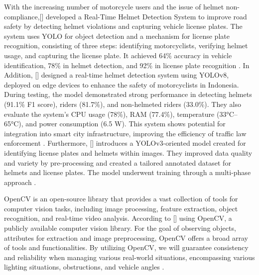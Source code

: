 \begin{refsection}
{    With the increasing number of motorcycle users and the issue of helmet non-compliance,\citeauthor{kumar2024realtime}[\citeyear{kumar2024realtime}] developed a Real-Time Helmet Detection System to improve road safety by detecting helmet violations and capturing vehicle license plates. The system uses YOLO for object detection and a mechanism for license plate recognition, consisting of three steps: identifying motorcyclists, verifying helmet usage, and capturing the license plate. It achieved 64\% accuracy in vehicle identification, 78\% in helmet detection, and 92\% in license plate recognition \cite{kumar2024realtime}. In Addition, \citeauthor{muhammad2024helmet} [\citeyear{muhammad2024helmet}] designed a real-time helmet detection system using YOLOv8, deployed on edge devices to enhance the safety of motorcyclists in Indonesia. During testing, the model demonstrated strong performance in detecting helmets (91.1\% F1 score), riders (81.7\%), and non-helmeted riders (33.0\%). They also evaluate the system’s CPU usage (78\%), RAM (77.4\%), temperature (33°C–65°C), and power consumption (6.5 W). This system shows potential for integration into smart city infrastructure, improving the efficiency of traffic law enforcement \cite {muhammad2024helmet}. Furthermore,\citeauthor{choubey2025helmet} [\citeyear{choubey2025helmet}] introduces a YOLOv3-oriented model created for identifying license plates and helmets within images. They improved data quality and variety by pre-processing and created a tailored annotated dataset for helmets and license plates. The model underwent training through a multi-phase approach \cite{choubey2025helmet}.

    OpenCV is an open-source library that provides a vast collection of tools for computer vision tasks, including image processing, feature extraction, object recognition, and real-time video analysis. According to \citeauthor{satheesh2024automated} [\citeyear{satheesh2024automated}] using OpenCV, a publicly available computer vision library. For the goal of observing objects, attributes for extraction and image preprocessing, OpenCV offers a broad array of tools and functionalities. By utilizing OpenCV, we will guarantee consistency and reliability when managing various real-world situations, encompassing various lighting situations, obstructions, and vehicle angles \cite{satheesh2024automated}.

}
\end{refsection}
